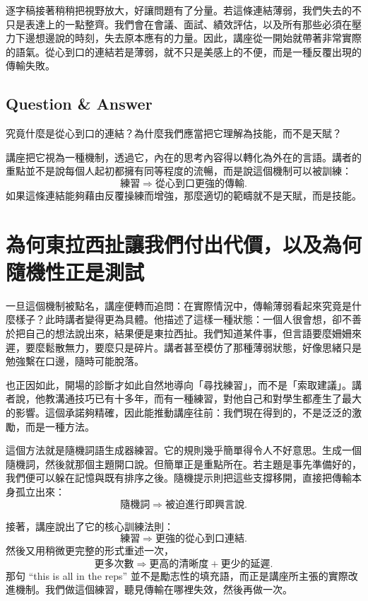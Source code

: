 逐字稿接著稍稍把視野放大，好讓問題有了分量。若這條連結薄弱，我們失去的不只是表達上的一點整齊。我們會在會議、面試、績效評估，以及所有那些必須在壓力下邊想邊說的時刻，失去原本應有的力量。因此，講座從一開始就帶著非常實際的語氣。從心到口的連結若是薄弱，就不只是美感上的不便，而是一種反覆出現的傳輸失敗。

\subsection{Question \& Answer}

究竟什麼是從心到口的連結？為什麼我們應當把它理解為技能，而不是天賦？

講座把它視為一種機制，透過它，內在的思考內容得以轉化為外在的言語。講者的重點並不是說每個人起初都擁有同等程度的流暢，而是說這個機制可以被訓練：
\begin{equation}
\text{練習} \Longrightarrow \text{從心到口更強的傳輸}.
\end{equation}
如果這條連結能夠藉由反覆操練而增強，那麼適切的範疇就不是天賦，而是技能。

\section{為何東拉西扯讓我們付出代價，以及為何隨機性正是測試}

一旦這個機制被點名，講座便轉而追問：在實際情況中，傳輸薄弱看起來究竟是什麼樣子？此時講者變得更為具體。他描述了這樣一種狀態：一個人很會想，卻不善於把自己的想法說出來，結果便是東拉西扯。我們知道某件事，但言語要麼姍姍來遲，要麼鬆散無力，要麼只是碎片。講者甚至模仿了那種薄弱狀態，好像思緒只是勉強繫在口邊，隨時可能脫落。

也正因如此，開場的診斷才如此自然地導向「尋找練習」，而不是「索取建議」。講者說，他教溝通技巧已有十多年，而有一種練習，對他自己和對學生都產生了最大的影響。這個承諾夠精確，因此能推動講座往前：我們現在得到的，不是泛泛的激勵，而是一種方法。

這個方法就是隨機詞語生成器練習。它的規則幾乎簡單得令人不好意思。生成一個隨機詞，然後就那個主題開口說。但簡單正是重點所在。若主題是事先準備好的，我們便可以躲在記憶與既有排序之後。隨機提示則把這些支撐移開，直接把傳輸本身孤立出來：
\begin{equation}
\text{隨機詞} \Longrightarrow \text{被迫進行即興言說}.
\end{equation}

接著，講座說出了它的核心訓練法則：
\begin{equation}
\text{練習} \Longrightarrow \text{更強的從心到口連結}.
\end{equation}
然後又用稍微更完整的形式重述一次，
\begin{equation}
\text{更多次數} \Longrightarrow \text{更高的清晰度} + \text{更少的延遲}.
\end{equation}
那句 ``this is all in the reps'' 並不是勵志性的填充語，而正是講座所主張的實際改進機制。我們做這個練習，聽見傳輸在哪裡失效，然後再做一次。

